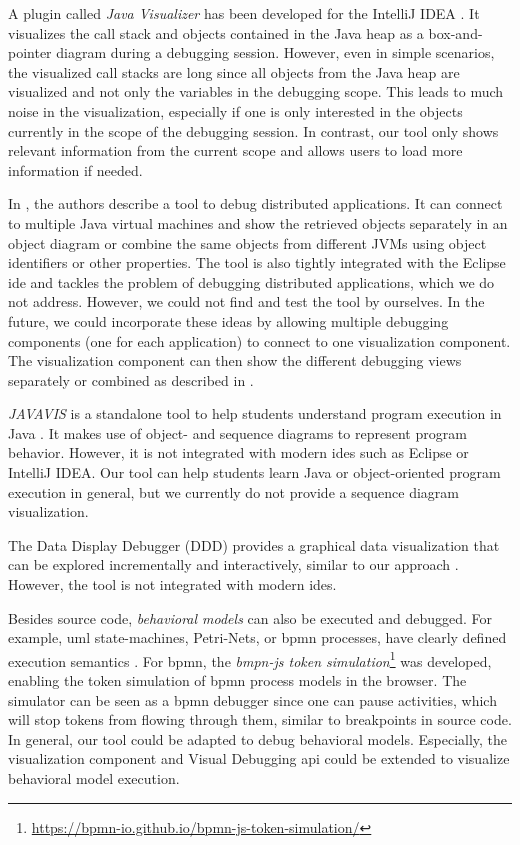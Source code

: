 \documentclass[conference]{IEEEtran}
\newcommand{\intellij}{IntelliJ IDEA}
\begin{document}
A plugin called \textit{Java Visualizer} has been developed for the \intellij{} \cite{JavaVisualizerIntelliJ}.
It visualizes the call stack and objects contained in the Java heap as a box-and-pointer diagram during a debugging session.
However, even in simple scenarios, the visualized call stacks are long since all objects from the Java heap are visualized and not only the variables in the debugging scope.
This leads to much noise in the visualization, especially if one is only interested in the objects currently in the scope of the debugging session.
In contrast, our tool only shows relevant information from the current scope and allows users to load more information if needed.

In \cite{kochGraphicalDebuggingDistributed2015}, the authors describe a tool to debug distributed applications.
It can connect to multiple Java virtual machines and show the retrieved objects separately in an object diagram or combine the same objects from different JVMs using object identifiers or other properties.
The tool is also tightly integrated with the Eclipse \gls*{ide} and tackles the problem of debugging distributed applications, which we do not address.
However, we could not find and test the tool by ourselves.
In the future, we could incorporate these ideas by allowing multiple debugging components (one for each application) to connect to one visualization component.
The visualization component can then show the different debugging views separately or combined as described in \cite{kochGraphicalDebuggingDistributed2015}.

\textit{JAVAVIS} is a standalone tool to help students understand program execution in Java \cite{oechsleJAVAVISAutomaticProgram2002}.
It makes use of object- and sequence diagrams to represent program behavior.
However, it is not integrated with modern \glspl*{ide} such as Eclipse or \intellij{}.
Our tool can help students learn Java or object-oriented program execution in general, but we currently do not provide a sequence diagram visualization.

The Data Display Debugger (DDD) provides a graphical data visualization that can be explored incrementally
and interactively, similar to our approach \cite{zellerDDDFreeGraphical1996}.
However, the tool is not integrated with modern \gls*{ide}s.

Besides source code, \textit{behavioral models} can also be executed and debugged.
For example, \gls*{uml} state-machines, Petri-Nets, or \gls*{bpmn} processes, have clearly defined execution semantics \cite{objectmanagementgroupUnifiedModelingLanguage2017, objectmanagementgroupBusinessProcessModel2013}.
For \gls*{bpmn}, the \textit{bmpn-js token simulation}\footnote{\url{https://bpmn-io.github.io/bpmn-js-token-simulation/}} was developed, enabling the token simulation of \gls*{bpmn} process models in the browser.
The simulator can be seen as a \gls*{bpmn} debugger since one can pause activities, which will stop tokens from flowing through them, similar to breakpoints in source code.
In general, our tool could be adapted to debug behavioral models.
Especially, the visualization component and Visual Debugging \gls*{api} could be extended to visualize behavioral model execution.
\end{document}
